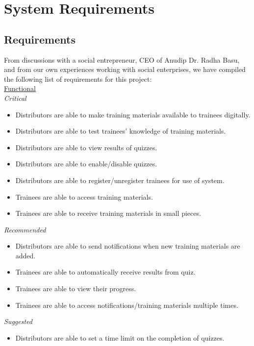 \chapter{System Requirements}


\section{Requirements}
From discussions with a social entrepreneur, CEO of Anudip Dr. Radha Basu, and from our own experiences working with social enterprises, we have compiled the following list of requirements for this project: \\[-0.7\baselineskip]

\underline{Functional}\\
\textit{Critical}
\begin{itemize}
\item Distributors are able to make training materials available to trainees digitally.
\item Distributors are able to test trainees’ knowledge of training materials.
\item Distributors are able to view results of quizzes.
\item Distributors are able to enable/disable quizzes.
\item Distributors are able to register/unregister trainees for use of system.
\item Trainees are able to access training materials.
\item Trainees are able to receive training materials in small pieces.
\end{itemize}

\textit{Recommended}
\begin{itemize}
\item Distributors are able to send notifications when new training materials are added.
\item Trainees are able to automatically receive results from quiz.
\item Trainees are able to view their progress.
\item Trainees are able to access notifications/training materials multiple times.
\end{itemize}

\textit{Suggested}
\begin{itemize}
\item Distributors are able to set a time limit on the completion of quizzes.\\[-0.5\baselineskip]
\end{itemize}

